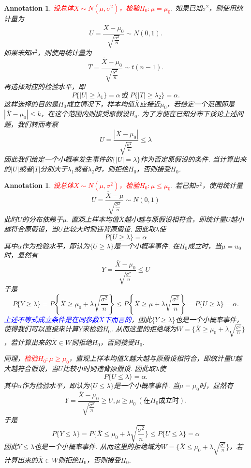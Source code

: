 \documentclass{article}
\newtheorem{annotation}[theorem]{Annotation}
\newcommand{\redt}[1]{\textcolor{red}{#1}}
\newcommand{\bluet}[1]{\textcolor{blue}{#1}}
\begin{document}
\begin{annotation}
\rm \redt{设总体$X \sim N(\mu,\sigma^2)$，检验$H_0: \mu=\mu_0$}. 如果已知$\sigma^2$，则使用统计量为
$$
U = \frac{\overline{X}-\mu_0}{\sqrt{\frac{\sigma^2}{n}}} \sim N(0,1).
$$
如果未知$\sigma^2$，则使用统计量为
$$
T = \frac{\overline{X}-\mu_0}{\sqrt{\frac{S^2}{n}}} \sim t(n-1).
$$
再选择对应的检验水平，即
$$
P\{|U| \geq \lambda_1 \} = \alpha~\text{或} ~ P\{|T| \geq \lambda_2 \} = \alpha.
$$
这样选择的目的是$H_0$成立情况下，样本均值$\overline{X}$应接近$\mu_0$，若给定一个范围即是$|\overline{X} - \mu_0| \leq k$，在这个范围内则接受原假设$H_0$. 为了方便在已知分布下谈论上述问题，我们转而考察
$$
U = \frac{|\overline{X} - \mu_0|}{\sqrt{\frac{\sigma^2}{n}}} \leq \lambda
$$
因此我们给定一个小概率发生事件的$\{|U|=\lambda\}$作为否定原假设的条件. 
当计算出来的$|U|$或者$|T|$分别大于$\lambda_1$或者$\lambda_2$时，则拒绝$H_0$，否则接受$H_0$.
\end{annotation}

\begin{annotation}
\rm \redt{设总体$X \sim N(\mu,\sigma^2)$，检验$H_0: \mu \leq \mu_0$}. 若已知$\sigma^2$，使用统计量
$$
U = \frac{\overline{X}-\mu}{\sqrt{\frac{\sigma^2}{n}}} \sim N(0,1)
$$
此时$U$的分布依赖于$\mu$. 直观上样本均值$\overline{X}$越小越与原假设相符合，即统计量$U$越小越符合原假设，当$U$比较大时则违背原假设. 因此取$\lambda$使
$$
P\{U \geq \lambda\} = \alpha
$$
其中$\alpha$作为检验水平，即认为$\{U \geq \lambda\}$是一个小概率事件. 在$H_0$成立时，当$\mu = u_0$时，显然有
$$
Y = \frac{\overline{X}-\mu_0}{\sqrt{\frac{\sigma^2}{n}}} \leq U
$$
于是
$$
P\{Y \geq \lambda \} = P\left\{\overline{X} \geq \mu_0 + \lambda\sqrt{\frac{\sigma^2}{n}}\right\} \leq P\left\{ \overline{X} \geq \mu + \lambda\sqrt{\frac{\sigma^2}{n}} \right\} = P\{U \geq \lambda\} = \alpha.
$$ 
\bluet{上述不等式成立条件是在同参数$\overline{X}$下而言的}，因此$\{Y \geq \lambda\}$也是一个小概率事件，使得我们可以直接来计算$Y$来检验$H_0$. 从而这里的拒绝域为$W = \{\overline{X} \geq \mu_0 + \lambda\sqrt{\frac{\sigma^2}{n}}\}$，若计算出来的$\overline{X} \in W$则拒绝$H_0$，否则接受$H_0$. 

同理，\redt{检验$H_0: \mu \geq \mu_0$}，直观上样本均值$\overline{X}$越大越与原假设相符合，即统计量$U$越大越符合假设，当$U$比较小时则违背原假设. 因此取$\lambda$使
$$
P\{U \leq \lambda \} = \alpha.
$$
其中$\alpha$作为检验水平，即认为$\{U \leq \lambda\}$是一个小概率事件. 当$\mu=\mu_0$时，显然有
$$
Y = \frac{\overline{X}-\mu_0}{\sqrt{\frac{\sigma^2}{n}}} \geq U , \mu \geq \mu_0  ~(\text{在$H_0$成立时}).
$$
于是
$$
P\{Y \leq \lambda \} =  P\{\overline{X} \leq \mu_0 + \lambda\sqrt{\frac{\sigma^2}{n}}\} \leq P\{U \leq \lambda\} = \alpha
$$
因此${Y \leq \lambda}$也是一个小概率事件. 从而这里的拒绝域为$W = \{\overline{X} \leq \mu_0 + \lambda\sqrt{\frac{\sigma^2}{n}}\}$，若计算出来的$\overline{X} \in W$则拒绝$H_0$，否则接受$H_0$.
\end{annotation}
\end{document}
